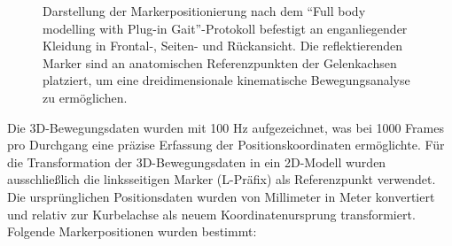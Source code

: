 \documentclass[
  letterpaper,
  DIV=11]{scrartcl}
\begin{document}
\begin{tcolorbox}[enhanced jigsaw, colback=white, bottomrule=.15mm, title=\textcolor{quarto-callout-note-color}{\faInfo}\hspace{0.5em}{Darstellung der reflektierenden Marker an anatomischen Referenzpunkten
eines Probanden}, toptitle=1mm, colbacktitle=quarto-callout-note-color!10!white, toprule=.15mm, rightrule=.15mm, arc=.35mm, leftrule=.75mm, left=2mm, breakable, bottomtitle=1mm, colframe=quarto-callout-note-color-frame, titlerule=0mm, opacityback=0, coltitle=black, opacitybacktitle=0.6]

\begin{figure}[H]


\caption{\label{fig-Marker}Darstellung der Markerpositionierung nach dem
``Full body modelling with Plug-in Gait''-Protokoll befestigt an
enganliegender Kleidung in Frontal-, Seiten- und Rückansicht. Die
reflektierenden Marker sind an anatomischen Referenzpunkten der
Gelenkachsen platziert, um eine dreidimensionale kinematische
Bewegungsanalyse zu ermöglichen.}

\end{figure}%

\end{tcolorbox}

Die 3D-Bewegungsdaten wurden mit 100 Hz aufgezeichnet, was bei 1000
Frames pro Durchgang eine präzise Erfassung der Positionskoordinaten
ermöglichte. Für die Transformation der 3D-Bewegungsdaten in ein
2D-Modell wurden ausschließlich die linksseitigen Marker (L-Präfix) als
Referenzpunkt verwendet. Die ursprünglichen Positionsdaten wurden von
Millimeter in Meter konvertiert und relativ zur Kurbelachse als neuem
Koordinatenursprung transformiert. Folgende Markerpositionen wurden
bestimmt:
\end{document}
